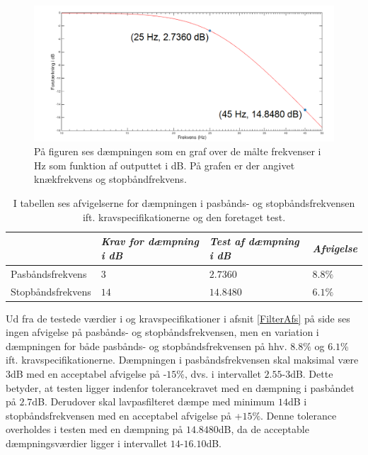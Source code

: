 \begin{figure}[H]
	\centering
	\includegraphics[scale=0.45]{figures/cProblemloesning/Lavpas_Matlab.PNG}
	\caption{På figuren ses dæmpningen som en graf over de målte frekvenser i Hz som funktion af outputtet i dB. På grafen er der angivet knækfrekvens og stopbåndfrekvens.}
	\label{fig:Lavpas_Matlab}
\end{figure}

\begin{table}[H]
	\centering
	\begin{tabular}{|l|l|l|l|}
		\hline
		& \textit{Krav for dæmpning i dB} 	& \textit{Test af dæmpning i dB}  &\textit{Afvigelse} \\ \hline
		Pasbåndsfrekvens & $3$	& $2.7360$	    & $8.8\%$ \\ \hline
		Stopbåndsfrekvens & $14$    & $14.8480$    & $6.1\%$  \\ \hline
	\end{tabular}
	\caption{I tabellen ses afvigelserne for dæmpningen i pasbånds- og stopbåndsfrekvensen ift. kravspecifikationerne og den foretaget test.}
	\label{Tab:Tolerance}
\end{table}
\noindent Ud fra de testede værdier i  og kravspecifikationer i afsnit \ref{FilterAfs} på side \pageref{FilterAfs} ses ingen afvigelse på pasbånds- og stopbåndsfrekvensen, men en variation i dæmpningen for både pasbånds- og stopbåndsfrekvensen på hhv. $8.8\%$ og $6.1$\% ift. kravspecifikationerne. Dæmpningen i pasbåndsfrekvensen skal maksimal være $3$dB med en acceptabel afvigelse på -$15\%$, dvs. i intervallet $2.55$-$3$dB. Dette betyder, at testen ligger indenfor tolerancekravet med en dæmpning i pasbåndet på $2.7$dB. Derudover skal lavpasfilteret dæmpe med minimum $14$dB i stopbåndsfrekvensen med en acceptabel afvigelse på +$15\%$. Denne tolerance overholdes i testen med en dæmpning på $14.8480$dB, da de acceptable dæmpningsværdier ligger i intervallet $14$-$16.10$dB.\\

